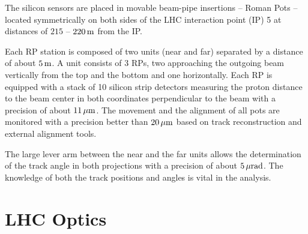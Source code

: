 \documentclass[doublecol]{epl/epl2}
\def\un#1{\,{\rm #1}}
\begin{document}
The silicon sensors are placed in movable beam-pipe insertions -- Roman Pots -- located symmetrically on both sides of the LHC interaction point (IP) 5 at distances of $215$ -- $220\un{m}$ from the IP.

Each RP station is composed of two units (near and far) separated by a distance of about $5\un{m}$. A unit consists of 3 RPs, two approaching the outgoing beam vertically from the top and the bottom and one horizontally. Each RP is equipped with a stack of 10 silicon strip detectors measuring the proton distance to the beam center in both coordinates perpendicular to the beam with a precision of about $11\un{\mu m}$.
The movement and the alignment of all pots are monitored with a precision better than $20\un{\mu m}$ based on track reconstruction and external alignment tools.

The large lever arm between the near and the far units allows the determination of the track angle in both projections with a precision of about $5\un{\mu rad}$. The know\-ledge of both the track positions and angles is vital in the analysis. 



\section{LHC Optics}
\end{document}
